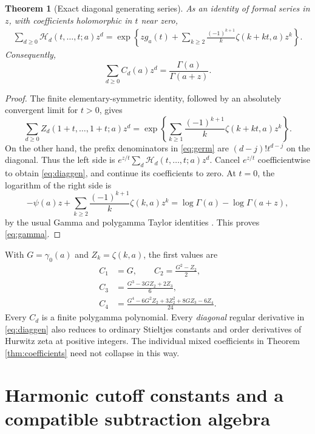 \documentclass[11pt,a4paper]{article}
\numberwithin{equation}{section}
\newtheorem{theorem}{Theorem}[section]
\theoremstyle{definition}\newtheorem{definition}[theorem]{Definition}
\theoremstyle{remark}\newtheorem{remark}[theorem]{Remark}
\newcommand{\HH}{\mathcal H}
\begin{document}
\begin{theorem}[Exact diagonal generating series]\label{thm:gamma}
As an identity of formal series in $z$, with coefficients holomorphic in
$t$ near zero,
\begin{align}\label{eq:diaggen}
 \sum_{d\ge0}\HH_d(t,\ldots,t;a)z^d
 =\exp\left\{zg_a(t)+
 \sum_{k\ge2}\frac{(-1)^{k+1}}k\zeta(k+kt,a)z^k\right\}.
\end{align}
Consequently,
\begin{equation}\label{eq:gamma}
 \boxed{\displaystyle \sum_{d\ge0}C_d(a)z^d
                 =\frac{\Gamma(a)}{\Gamma(a+z)}.}
\end{equation}
\end{theorem}
\begin{proof}
The finite elementary-symmetric identity, followed by an absolutely
convergent limit for $t>0$, gives
\[
 \sum_{d\ge0}Z_d(1+t,\ldots,1+t;a)z^d
 =\exp\left\{\sum_{k\ge1}\frac{(-1)^{k+1}}k
                         \zeta(k+kt,a)z^k\right\}.
\]
On the other hand, the prefix denominators in \eqref{eq:germ} are
$(d-j)!t^{d-j}$ on the diagonal. Thus the left side is
$e^{z/t}\sum_d\HH_d(t,\ldots,t;a)z^d$. Cancel $e^{z/t}$ coefficientwise
to obtain \eqref{eq:diaggen}, and continue its coefficients to zero.
At $t=0$, the logarithm of the right side is
\[
 -\psi(a)z+\sum_{k\ge2}\frac{(-1)^{k+1}}k\zeta(k,a)z^k
 =\log\Gamma(a)-\log\Gamma(a+z),
\]
by the usual Gamma and polygamma Taylor identities \cite{dlmf-gamma,dlmf-zeta}.
This proves \eqref{eq:gamma}.
\end{proof}

With $G=\gamma_0(a)$ and $Z_k=\zeta(k,a)$, the first values are
\begin{align}
 C_1&=G,\qquad C_2=\frac{G^2-Z_2}{2},\label{eq:C2}\\
 C_3&=\frac{G^3-3GZ_2+2Z_3}{6},\label{eq:C3}\\
 C_4&=\frac{G^4-6G^2Z_2+3Z_2^2+8GZ_3-6Z_4}{24}.
 \label{eq:C4}
\end{align}
Every $C_d$ is a finite polygamma polynomial. Every \emph{diagonal}
regular derivative in \eqref{eq:diaggen} also reduces to ordinary
Stieltjes constants and order derivatives of Hurwitz zeta at positive
integers. The individual mixed coefficients in Theorem
\ref{thm:coefficients} need not collapse in this way.

\section{Harmonic cutoff constants and a compatible subtraction algebra}
\label{sec:cutoff}
\end{document}
